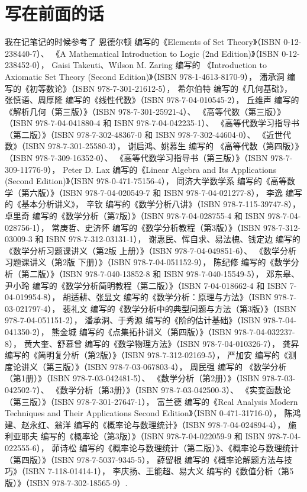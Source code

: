 \chapter*{写在前面的话}
我在记笔记的时候参考了
恩德尔顿 编写的《Elements of Set Theory》（ISBN 0-12-238440-7）、
《A Mathematical Introduction to Logic (2nd Edition)》（ISBN 0-12-238452-0），
Gaisi Takeuti、Wilson M. Zaring 编写的
《Introduction to Axiomatic Set Theory (Second Edition)》（ISBN 978-1-4613-8170-9），
潘承洞 编写的《初等数论》（ISBN 978-7-301-21612-5），
希尔伯特 编写的《几何基础》，
张慎语、周厚隆 编写的《线性代数》（ISBN 978-7-04-010545-2），
丘维声 编写的
《解析几何（第三版）》（ISBN 978-7-301-25921-4）、
《高等代数（第三版）》（ISBN 978-7-04-041880-4 和 ISBN 978-7-04-042235-1）、
《高等代数学习指导书（第二版）》（ISBN 978-7-302-48367-0 和 ISBN 978-7-302-44604-0）、
《近世代数》（ISBN 978-7-301-25580-3），
谢启鸿、姚慕生 编写的
《高等代数（第四版）》（ISBN 978-7-309-16352-0）、
《高等代数学习指导书（第三版）》（ISBN 978-7-309-11776-9），
Peter D. Lax 编写的《Linear Algebra and Its Applications (Second Edition)》（ISBN 978-0-471-75156-4），
同济大学数学系 编写的《高等数学（第六版）》（ISBN 978-7-04-020549-7 和 ISBN 978-7-04-021277-8），
李逸 编写的《基本分析讲义》，
辛钦 编写的《数学分析八讲》（ISBN 978-7-115-39747-8），
卓里奇 编写的《数学分析（第7版）》（ISBN 978-7-04-028755-4 和 ISBN 978-7-04-028756-1），
常庚哲、史济怀 编写的《数学分析教程（第3版）》（ISBN 978-7-312-03009-3 和 ISBN 978-7-312-03131-1），
谢惠民、恽自求、易法槐、钱定边 编写的
《数学分析习题课讲义（第2版 上册）》（ISBN 978-7-04-049851-6）、
《数学分析习题课讲义（第2版 下册）》（ISBN 978-7-04-051152-9），
陈纪修 编写的《数学分析（第二版）》（ISBN 978-7-040-13852-8 和 ISBN 978-7-040-15549-5），
邓东皋、尹小玲 编写的《数学分析简明教程（第二版）》（ISBN 7-04-018662-4 和 ISBN 7-04-019954-8），
胡适耕、张显文 编写的《数学分析：原理与方法》（ISBN 978-7-03-021797-4），
裴礼文 编写的《数学分析中的典型问题与方法（第3版）》（ISBN 978-7-04-051151-2），
潘承洞、于秀源 编写的《阶的估计基础》（ISBN 978-7-04-041350-2），
熊金城 编写的《点集拓扑讲义（第四版）》（ISBN 978-7-04-032237-8），
黄大奎、舒慕曾 编写的《数学物理方法》（ISBN 978-7-04-010326-7），
龚昇 编写的《简明复分析（第2版）》（ISBN 978-7-312-02169-5），
严加安 编写的《测度论讲义（第三版）》（ISBN 978-7-03-067803-4），
周民强 编写的
《数学分析（第1册）》（ISBN 978-7-03-042481-5）、
《数学分析（第2册）》（ISBN 978-7-03-042502-7）、
《数学分析（第3册）》（ISBN 978-7-03-042500-3）、
《实变函数论（第三版）》（ISBN 978-7-301-27647-1），
富兰德 编写的《Real Analysis Modern Techniques and Their Applications Second Edition》（ISBN 0-471-31716-0），
陈鸿建、赵永红、翁洋 编写的《概率论与数理统计》（ISBN 978-7-04-024894-4），
施利亚耶夫 编写的《概率论（第3版）》（ISBN 978-7-04-022059-9 和 ISBN 978-7-04-022555-6），
茆诗松 编写的《概率论与数理统计（第二版）》、《概率论与数理统计（第四版）》（ISBN 978-7-5037-9345-5），
薛留根 编写的《概率论解题方法与技巧》（ISBN 7-118-01414-1），
李庆扬、王能超、易大义 编写的《数值分析（第5版）》（ISBN 978-7-302-18565-9）.

